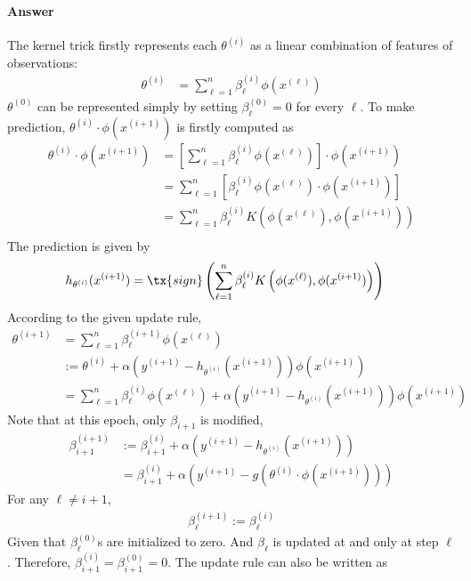 \documentclass[11pt]{article}
\newcommand{\upi}[0]{^{(i)}}
\begin{document}
	\paragraph{Answer} The kernel trick firstly represents each $\theta\upi$ as a linear combination of features of observations:
	\begin{align}
		\theta\upi &= \sum_{\ell=1}^n \beta_\ell\upi \phi(x^{(\ell)})
	\end{align}
	$\theta^{(0)}$ can be represented simply by setting $\beta_\ell^{(0)} = 0$ for every $\ell$. To make prediction, $\theta\upi \cdot \phi(x^{(i+1)})$ is firstly computed as 
	\begin{align}
		\theta\upi \cdot \phi(x^{(i+1)}) &= \left[ \sum_{\ell=1}^n \beta_\ell\upi \phi(x^{(\ell)})\right] \cdot \phi(x^{(i+1)}) \\
		&= \sum_{\ell=1}^n \left[ \beta_\ell\upi \phi(x^{(\ell)}) \cdot \phi(x^{(i+1)}) \right] \\
		&= \sum_{\ell=1}^n \beta_\ell\upi K \left(\phi(x^{(\ell)}),\phi(x^{(i+1)}) \right) \\
	\end{align}
	The prediction is given by 
	\begin{align}
		h_{\theta\upi}(x^{(i+1)}) &= \tx{sign} \left (
			\sum_{\ell=1}^n \beta_\ell\upi K \left(\phi(x^{(\ell)}),\phi(x^{(i+1)}) \right)
		\right )
	\end{align}
	According to the given update rule, 
	\begin{align}
		\theta^{(i+1)} &= \sum_{\ell=1}^n \beta_\ell^{(i+1)} \phi(x^{(\ell)}) \\
		&:= \theta\upi + \alpha \left(y^{(i+1)} - h_{\theta\upi}(x^{(i+1)})\right) \phi(x^{(i+1)}) \\
		&= \sum_{\ell=1}^n \beta_\ell^{(i)} \phi(x^{(\ell)}) 
		+ \alpha \left(y^{(i+1)} - h_{\theta\upi}(x^{(i+1)})\right) \phi(x^{(i+1)})
	\end{align}
	Note that at this epoch, only $\beta_{i+1}$ is modified,
	\begin{align}
		\beta_{i+1}^{(i+1)} &:= \beta_{i+1}\upi + \alpha \left(y^{(i+1)} - h_{\theta\upi}(x^{(i+1)})\right) \\
		&= \beta_{i+1}\upi +\alpha \left(y^{(i+1)} - g(\theta\upi \cdot \phi(x^{(i+1)}) )\right)
	\end{align}
	For any $\ell \neq i + 1$,
	\begin{align}
		\beta_{\ell}^{(i+1)} := \beta_{\ell}^{(i)}
	\end{align}
	Given that $\beta^{(0)}_\ell$s are initialized to zero. And $\beta_{\ell}$ is updated at and only at step $\ell$. Therefore, $\beta_{i+1}\upi = \beta_{i+1}^{(0)} = 0$. The update rule can also be written as
\end{document}
